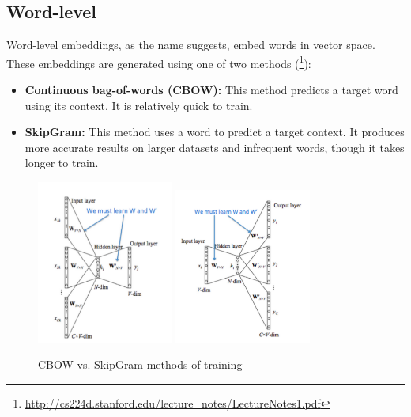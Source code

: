\subsection{Word-level}
Word-level embeddings, as the name suggests, embed words in vector space. These embeddings are generated using one of two methods (\footnote{\url{http://cs224d.stanford.edu/lecture_notes/LectureNotes1.pdf}}):
\begin{itemize}
\item \textbf{Continuous bag-of-words (CBOW):} This method predicts a target word using its context. It is relatively quick to train.
\item \textbf{SkipGram:} This method uses a word to predict a target context. It produces more accurate results on larger datasets and infrequent words, though it takes longer to train.
\end{itemize}
\begin{figure}[!htb]
\begin{center}
\includegraphics[width=0.4\textwidth]{Figures/CBOW.PNG}
\includegraphics[width=0.4\textwidth]{Figures/SkipGram.PNG}
\caption{CBOW vs. SkipGram methods of training}
\label{fig:cbowVSskip}
\end{center}
\end{figure}


